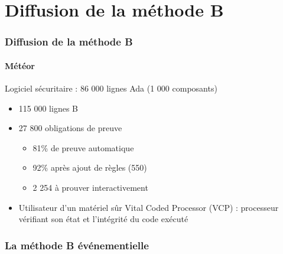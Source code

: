 \documentclass[11pt,a4paper,xcolor=table]{beamer} %
\begin{document}
\section{Diffusion de la méthode B}
\begin{frame}
\frametitle{Diffusion de la méthode B}
\framesubtitle{Météor}
Logiciel sécuritaire : 86 000 lignes Ada (1 000
composants)
\begin{itemize}
\item 115 000 lignes B
\item 27 800 obligations de preuve
\begin{itemize}
\item 81\% de preuve automatique
\item 92\% après ajout de règles (550)
\item 2 254 à prouver interactivement
\end{itemize}
\item Utilisateur d'un matériel sûr Vital Coded Processor (VCP) : processeur vérifiant son état et l'intégrité du code exécuté
\end{itemize}
\end{frame}

\begin{frame}
\frametitle{La méthode B événementielle}

\end{frame}
\end{document}
